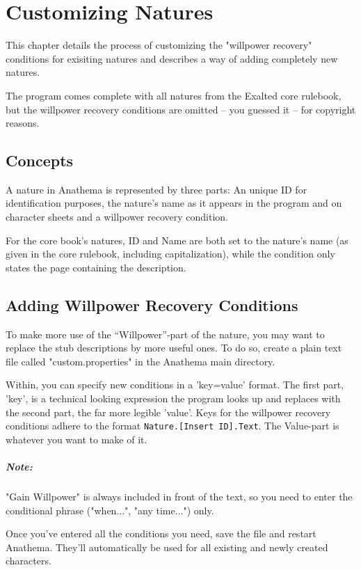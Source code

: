 \chapter{Customizing Natures}
This chapter details the process of customizing the "willpower recovery" conditions for 
exisiting natures and describes a way of adding completely new natures. 

The program comes complete with all natures from the Exalted core rulebook, but the willpower recovery conditions are omitted -- you guessed it -- for copyright reasons. 

\section{Concepts}
A nature in Anathema is represented by three parts: An unique ID for identification purposes,
the nature's name as it appears in the program and on character sheets and a
willpower recovery condition. 

For the core book's natures, ID and Name are both set to the nature's name (as given in the core rulebook, including capitalization), while the condition only states the page containing the description.

\section{Adding Willpower Recovery Conditions}
To make more use of the "`Willpower"'-part of the nature, you may want to replace the stub descriptions by more useful ones.
To do so, create a plain text file called "custom.properties" in the Anathema main directory.

Within, you can specify new conditions in a 'key=value' format. The first part, 'key', is a technical looking expression the program looks up and replaces with the second part, the far more legible 'value'. Keys for the willpower recovery conditions adhere to the format \texttt{Nature.[Insert ID].Text}. The Value-part is whatever you want to make of it.

\paragraph{Note:} "Gain Willpower" is always included in front of the text, so you need to enter the conditional
phrase ("when...", "any time...") only.

Once you've entered all the conditions you need, save the file and restart Anathema. They'll automatically be used for all existing and newly created characters.

